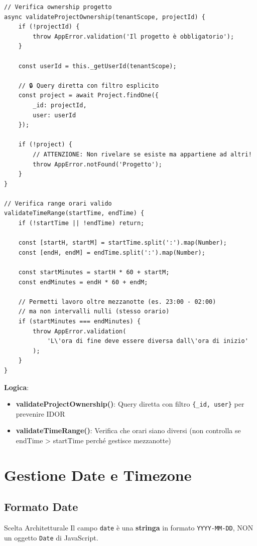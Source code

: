 \documentclass[11pt,a4paper]{article}
\begin{document}
\begin{lstlisting}
// Verifica ownership progetto
async validateProjectOwnership(tenantScope, projectId) {
    if (!projectId) {
        throw AppError.validation('Il progetto è obbligatorio');
    }

    const userId = this._getUserId(tenantScope);
    
    // 🔒 Query diretta con filtro esplicito
    const project = await Project.findOne({ 
        _id: projectId, 
        user: userId 
    });
    
    if (!project) {
        // ATTENZIONE: Non rivelare se esiste ma appartiene ad altri!
        throw AppError.notFound('Progetto');
    }
}

// Verifica range orari valido
validateTimeRange(startTime, endTime) {
    if (!startTime || !endTime) return;
    
    const [startH, startM] = startTime.split(':').map(Number);
    const [endH, endM] = endTime.split(':').map(Number);
    
    const startMinutes = startH * 60 + startM;
    const endMinutes = endH * 60 + endM;
    
    // Permetti lavoro oltre mezzanotte (es. 23:00 - 02:00)
    // ma non intervalli nulli (stesso orario)
    if (startMinutes === endMinutes) {
        throw AppError.validation(
            'L\'ora di fine deve essere diversa dall\'ora di inizio'
        );
    }
}
\end{lstlisting}

\textbf{Logica}:
\begin{itemize}
    \item \textbf{validateProjectOwnership()}: Query diretta con filtro \texttt{\{_id, user\}} per prevenire IDOR
    \item \textbf{validateTimeRange()}: Verifica che orari siano diversi (non controlla se endTime > startTime perché gestisce mezzanotte)
\end{itemize}

\section{Gestione Date e Timezone}

\subsection{Formato Date}

\begin{importantbox}{Scelta Architetturale}
Il campo \texttt{date} è una \textbf{stringa} in formato \texttt{YYYY-MM-DD}, NON un oggetto \texttt{Date} di JavaScript.
\end{importantbox}
\end{document}
